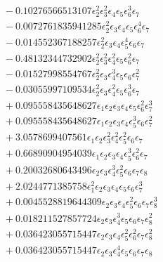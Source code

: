 \documentclass[10pt]{article}
\begin{document}
\begin{align*}
&{}  - 0.10276566513107 \epsilon_{2}^{2} \epsilon_{3}^{2} \epsilon_{4} \epsilon_{5} \epsilon_{6}^{3} \epsilon_{7} \\
&{}  - 0.0072761835941285 \epsilon_{2}^{2} \epsilon_{3} \epsilon_{4} \epsilon_{5} \epsilon_{6}^{4} \epsilon_{7} \\
&{}  - 0.014552367188257 \epsilon_{2}^{2} \epsilon_{3} \epsilon_{4} \epsilon_{5}^{4} \epsilon_{6} \epsilon_{7} \\
&{}  - 0.48132344732902 \epsilon_{2}^{2} \epsilon_{3}^{2} \epsilon_{4}^{2} \epsilon_{5} \epsilon_{6}^{2} \epsilon_{7} \\
&{}  - 0.01527998554767 \epsilon_{2}^{2} \epsilon_{3} \epsilon_{4}^{3} \epsilon_{5} \epsilon_{6} \epsilon_{7}^{2} \\
&{}  - 0.03055997109534 \epsilon_{2}^{2} \epsilon_{3} \epsilon_{4}^{2} \epsilon_{5} \epsilon_{6}^{3} \epsilon_{7} \\
&{}  + 0.095558435648627 \epsilon_{1} \epsilon_{2} \epsilon_{3} \epsilon_{4} \epsilon_{5} \epsilon_{6}^{2} \epsilon_{7}^{3} \\
&{}  + 0.095558435648627 \epsilon_{1} \epsilon_{2} \epsilon_{3} \epsilon_{4} \epsilon_{5}^{3} \epsilon_{6} \epsilon_{7}^{2} \\
&{}  + 3.0578699407561 \epsilon_{1} \epsilon_{2} \epsilon_{3}^{2} \epsilon_{4}^{2} \epsilon_{5}^{2} \epsilon_{6} \epsilon_{7} \\
&{}  + 0.66890904954039 \epsilon_{1} \epsilon_{2} \epsilon_{3} \epsilon_{4} \epsilon_{5}^{3} \epsilon_{6}^{2} \epsilon_{7} \\
&{}  + 0.20032680643496 \epsilon_{2} \epsilon_{3} \epsilon_{4}^{3} \epsilon_{5}^{2} \epsilon_{6} \epsilon_{7} \epsilon_{8} \\
&{}  + 2.0244771385758 \epsilon_{1}^{2} \epsilon_{2} \epsilon_{3} \epsilon_{4} \epsilon_{5} \epsilon_{6} \epsilon_{7}^{3} \\
&{}  + 0.0045528819644309 \epsilon_{2} \epsilon_{3} \epsilon_{4} \epsilon_{5}^{2} \epsilon_{6} \epsilon_{7} \epsilon_{8}^{3} \\
&{}  + 0.018211527857724 \epsilon_{2} \epsilon_{3} \epsilon_{4}^{3} \epsilon_{5} \epsilon_{6} \epsilon_{7} \epsilon_{8}^{2} \\
&{}  + 0.036423055715447 \epsilon_{2} \epsilon_{3} \epsilon_{4} \epsilon_{5}^{2} \epsilon_{6}^{2} \epsilon_{7} \epsilon_{8}^{2} \\
&{}  + 0.036423055715447 \epsilon_{2} \epsilon_{3} \epsilon_{4}^{4} \epsilon_{5} \epsilon_{6} \epsilon_{7} \epsilon_{8} \\

\end{align*}
\end{document}
